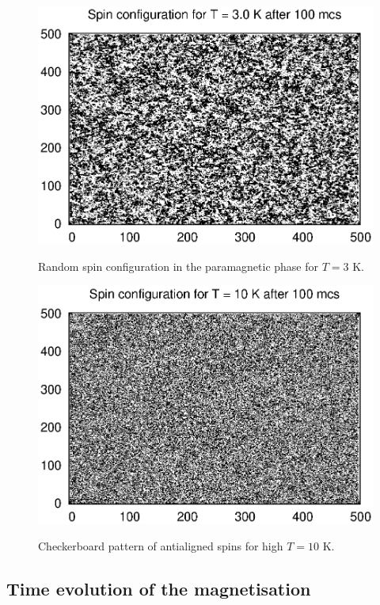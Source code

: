 \documentclass[a4paper]{article}
\begin{document}
\begin{figure}[h]
\centering
\begin{minipage}[b]{0.45\linewidth}
\includegraphics[width=1\textwidth]{warm.eps}
\label{fig:minipage1}
\caption{Random spin configuration in the paramagnetic phase for $T = 3$ K.}
\end{minipage}
\quad
\begin{minipage}[b]{0.45\linewidth}
\includegraphics[width=1\textwidth]{hot.eps}
\label{fig:minipage2}
\caption{Checkerboard pattern of antialigned spins for high $T = 10$ K.}
\end{minipage}
\end{figure}

\subsection{Time evolution of the magnetisation}
\end{document}
